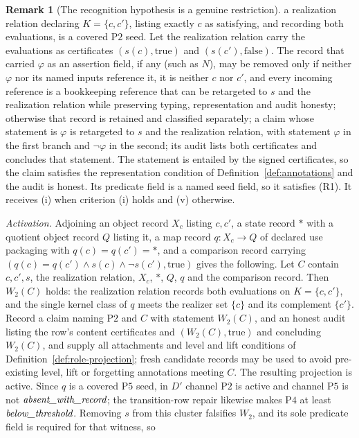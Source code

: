 \documentclass[11pt]{article}
\theoremstyle{definition}
\newtheorem{remark}[theorem]{Remark}
\newcommand{\belowthr}{\textit{below\_\allowbreak threshold}}
\newcommand{\absentrec}{\textit{absent\_\allowbreak with\_\allowbreak record}}
\newcommand{\Ptwo}{\ensuremath{\mathrm{P2}}}
\newcommand{\Pfour}{\ensuremath{\mathrm{P4}}}
\newcommand{\Pfive}{\ensuremath{\mathrm{P5}}}
\begin{document}
\begin{remark}[The recognition hypothesis is a genuine restriction]
a realization relation declaring \(K=\{c,c'\}\), listing exactly \(c\) as
satisfying, and recording both evaluations, is a covered \Ptwo{} seed. Let the
realization relation carry the evaluations as certificates
\((s(c),\mathrm{true})\) and \((s(c'),\mathrm{false})\). The record that carried \(\varphi\) as an assertion field, if any (such as
\(N\)), may be removed only if neither \(\varphi\) nor its named inputs
reference it, it is neither \(c\) nor \(c'\), and every incoming reference is a
bookkeeping reference that can be retargeted to \(s\) and the realization
relation while preserving typing, representation and audit honesty; otherwise
that record is retained and classified separately; a claim whose statement
is \(\varphi\) is retargeted to \(s\) and the realization relation, with statement
\(\varphi\) in the first branch and \(\neg\varphi\) in the second; its audit lists
both certificates and concludes that statement. The statement is entailed by
the signed certificates, so the claim satisfies the representation condition
of Definition~\ref{def:annotations} and the audit is honest. Its
predicate field is a named seed field, so it satisfies (R1). It receives (i)
when criterion (i) holds and (v) otherwise. \par\emph{Activation.} Adjoining an object record \(X_c\)
listing \(c,c'\), a state record \(*\) with a quotient object record \(Q\)
listing it, a map record \(q:X_c\to Q\) of declared use packaging with
\(q(c)=q(c')=*\), and a comparison record carrying
\((q(c)=q(c')\wedge s(c)\wedge\neg s(c'),\mathrm{true})\) gives the following. Let \(C\) contain \(c,c',s\), the realization
relation, \(X_c\), \(*\), \(Q\), \(q\) and the comparison record. Then
\(W_2(C)\) holds: the realization relation records both evaluations on
\(K=\{c,c'\}\), and the single kernel class of \(q\) meets the realizer set
\(\{c\}\) and its complement \(\{c'\}\). Record a claim naming \Ptwo{} and \(C\)
with statement \(W_2(C)\), and an honest audit listing the row's content
certificates and \((W_2(C),\mathrm{true})\) and concluding \(W_2(C)\), and
supply all attachments and level and lift conditions of
Definition~\ref{def:role-projection}; fresh candidate records may be used to
avoid pre-existing level, lift or forgetting annotations meeting \(C\). The
resulting projection is active. Since \(q\) is a covered \Pfive{} seed, in \(D'\) channel \Ptwo{} is active and channel \Pfive{} is not \(\absentrec\); the transition-row repair likewise makes \Pfour{} at least \(\belowthr\). Removing \(s\) from this cluster falsifies
\(W_2\), and its sole predicate field is required for that witness, so

\end{remark}
\end{document}
